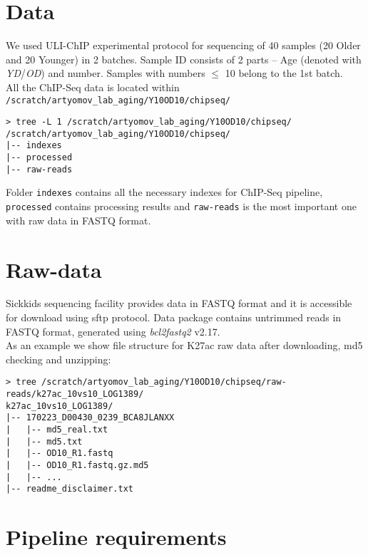 \documentclass{article}
\begin{document}
\section{Data}
We used ULI-ChIP experimental protocol for sequencing of 40 samples (20 Older and 20 Younger) in 2 batches. 
Sample ID consists of 2 parts – Age (denoted with \textit{YD}/\textit{OD}) and number. Samples with numbers $\leq$ 10 belong to the 1st batch.\\
All the ChIP-Seq data is located within \texttt{/scratch/artyomov\_lab\_aging/Y10OD10/chipseq/}
\begin{lstlisting}
> tree -L 1 /scratch/artyomov_lab_aging/Y10OD10/chipseq/
/scratch/artyomov_lab_aging/Y10OD10/chipseq/
|-- indexes
|-- processed
|-- raw-reads 
\end{lstlisting}
Folder \texttt{indexes} contains all the necessary indexes for ChIP-Seq pipeline, \texttt{processed} contains processing results and \texttt{raw-reads} is the most important one with raw data in FASTQ format.

\section{Raw-data}
Sickkids sequencing facility provides data in FASTQ format and it is accessible for download using sftp protocol. Data package contains untrimmed reads in FASTQ format, generated using \textit{bcl2fastq2} v2.17.\\
As an example we show file structure for K27ac raw data after downloading, md5 checking and unzipping:
\begin{lstlisting}
> tree /scratch/artyomov_lab_aging/Y10OD10/chipseq/raw-reads/k27ac_10vs10_LOG1389/
k27ac_10vs10_LOG1389/
|-- 170223_D00430_0239_BCA8JLANXX
|	|-- md5_real.txt
|	|-- md5.txt
|	|-- OD10_R1.fastq
|	|-- OD10_R1.fastq.gz.md5
|	|-- ...
|-- readme_disclaimer.txt
\end{lstlisting}

\section{Pipeline requirements}
\end{document}
